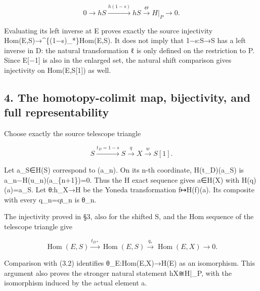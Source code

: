 \[
 0\longrightarrow hS\xrightarrow{h(1-s)}hS
          \xrightarrow{\Theta}H|_P\longrightarrow0. \tag{3.2}
\]

Evaluating its left inverse at E proves exactly the source injectivity Hom(E,\allowbreak{}S)\allowbreak{}\allowbreak{}→\textasciicircum{}\{(1−s)\allowbreak{}\_\allowbreak{}*\}Hom(E,\allowbreak{}S)\allowbreak{}. It does not imply that 1−s:\allowbreak{}S\allowbreak{}→S has a left inverse in D:\allowbreak{} the natural transformation ℓ is only defined on the restriction to P. Since E[−1]\allowbreak{} is also in the enlarged set,\allowbreak{} the natural shift comparison gives injectivity on Hom(E,\allowbreak{}S[1]\allowbreak{})\allowbreak{} as well.

\subsection{\texorpdfstring{4. The homotopy-colimit map,\allowbreak{} bijectivity,\allowbreak{} and full representability}{4. The homotopy-colimit   and full representability}}\label{proofs-11460-11655-the-homotopy-colimit-map-bijectivity-and-full-representability}

Choose exactly the source telescope triangle

\[
 S\xrightarrow{t_D=1-s}S\xrightarrow{q}X\xrightarrow{w}S[1].
\]

Let a\_\allowbreak{}S\allowbreak{}∈H(S)\allowbreak{} correspond to (a\_\allowbreak{}n)\allowbreak{}. On its n-th coordinate,\allowbreak{} H(t\_\allowbreak{}D)\allowbreak{}(a\_\allowbreak{}S)\allowbreak{} is a\_\allowbreak{}n−H(u\_\allowbreak{}n)\allowbreak{}(a\_\allowbreak{}\{n\allowbreak{}+1\})\allowbreak{}\allowbreak{}=0. Thus the H exact sequence gives a\allowbreak{}∈H(X)\allowbreak{} with H(q)\allowbreak{}(a)\allowbreak{}\allowbreak{}=a\_\allowbreak{}S. Let θ:\allowbreak{}h\_\allowbreak{}X\allowbreak{}→H be the Yoneda transformation f\allowbreak{}↦H(f)\allowbreak{}(a)\allowbreak{}. Its composite with every q\_\allowbreak{}n\allowbreak{}=qι\_\allowbreak{}n is θ\_\allowbreak{}n.

The injectivity proved in §3,\allowbreak{} also for the shifted S,\allowbreak{} and the Hom sequence of the telescope triangle give

\[
 \operatorname{Hom}(E,S)\xrightarrow{t_{D*}}
 \operatorname{Hom}(E,S)\xrightarrow{q_*}
 \operatorname{Hom}(E,X)\longrightarrow0. \tag{4.1}
\]

Comparison with (3.2)\allowbreak{} identifies θ\_\allowbreak{}E:\allowbreak{}Hom(E,\allowbreak{}X)\allowbreak{}\allowbreak{}→H(E)\allowbreak{} as an isomorphism. This argument also proves the stronger natural statement hX≅H|\_\allowbreak{}P,\allowbreak{} with the isomorphism induced by the actual element a.

